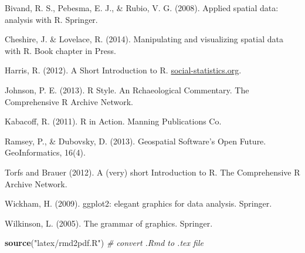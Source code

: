 \documentclass[]{article}
\newenvironment{Shaded}{}{}
\newcommand{\KeywordTok}[1]{\textcolor[rgb]{0.00,0.44,0.13}{\textbf{{#1}}}}
\newcommand{\StringTok}[1]{\textcolor[rgb]{0.25,0.44,0.63}{{#1}}}
\newcommand{\CommentTok}[1]{\textcolor[rgb]{0.38,0.63,0.69}{\textit{{#1}}}}
\newcommand{\NormalTok}[1]{{#1}}
\begin{document}
Bivand, R. S., Pebesma, E. J., \& Rubio, V. G. (2008). Applied spatial
data: analysis with R. Springer.

Cheshire, J. \& Lovelace, R. (2014). Manipulating and visualizing
spatial data with R. Book chapter in Press.

Harris, R. (2012). A Short Introduction to R.
\href{http://www.social-statistics.org/}{social-statistics.org}.

Johnson, P. E. (2013). R Style. An Rchaeological Commentary. The
Comprehensive R Archive Network.

Kabacoff, R. (2011). R in Action. Manning Publications Co.

Ramsey, P., \& Dubovsky, D. (2013). Geospatial Software's Open Future.
GeoInformatics, 16(4).

Torfs and Brauer (2012). A (very) short Introduction to R. The
Comprehensive R Archive Network.

Wickham, H. (2009). ggplot2: elegant graphics for data analysis.
Springer.

Wilkinson, L. (2005). The grammar of graphics. Springer.

\begin{Shaded}
\begin{Highlighting}[]
\KeywordTok{source}\NormalTok{(}\StringTok{"latex/rmd2pdf.R"}\NormalTok{)  }\CommentTok{# convert .Rmd to .tex file}
\end{Highlighting}
\end{Shaded}
\end{document}
